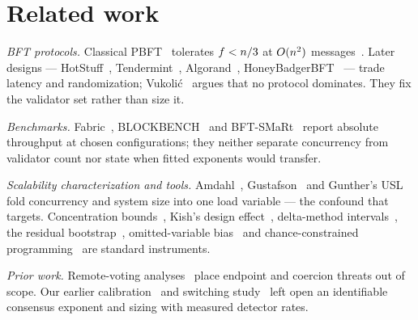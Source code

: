\section{Related work}
\label{sec:related}

\emph{BFT protocols.}
Classical PBFT~\cite{castro1999} tolerates $f<n/3$ at $O(n^{2})$
messages~\cite{lamport1982,dwork1988}. Later designs ---
HotStuff~\cite{yin2019}, Tendermint~\cite{buchman2016},
Algorand~\cite{gilad2017}, HoneyBadgerBFT~\cite{miller2016} --- trade latency
and randomization; Vukoli\'{c}~\cite{vukolic2015} argues that no protocol
dominates. They fix the validator set rather than size it.

\emph{Benchmarks.}
Fabric~\cite{androulaki2018,thakkar2018}, BLOCKBENCH~\cite{dinh2017} and
BFT-SMaRt~\cite{sousa2018} report absolute throughput at chosen configurations;
they neither separate concurrency from validator count nor state when fitted
exponents would transfer.

\emph{Scalability characterization and tools.}
Amdahl~\cite{amdahl1967}, Gustafson~\cite{gustafson1988} and Gunther's
USL~\cite{gunther2007} fold concurrency and system size into one load variable
--- the confound that \RNM{} targets. Concentration
bounds~\cite{hoeffding1963,boucheron2013}, Kish's design
effect~\cite{kish1965}, delta-method intervals~\cite{seber2003}, the residual
bootstrap~\cite{efron1993}, \mbox{omitted-variable} bias~\cite{wooldridge2010}
and chance-constrained programming~\cite{charnes1959,nemirovski2007} are
standard instruments.

\emph{Prior work.}
Remote-voting analyses~\cite{springall2014,specter2020,park2021} place endpoint
and coercion threats out of scope. Our earlier
calibration~\cite{peniak2026a} and switching study~\cite{peniak2026b} left open
an identifiable consensus exponent and sizing with measured detector rates.
